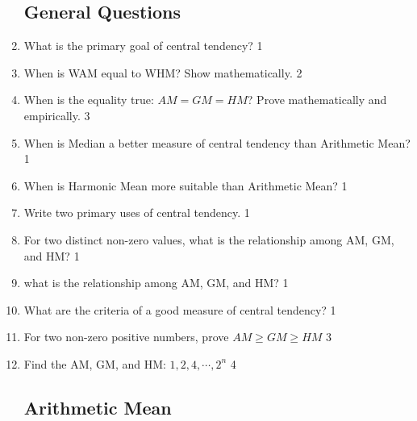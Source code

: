 \documentclass[a4paper,oneside]{book}
\begin{document}
\begin{enumerate}

\subsection{General Questions}

    \item What is the primary goal of central tendency? \hfill 1
    \item When is WAM equal to WHM? Show mathematically. \hfill 2
    \item When is the equality true: $AM=GM=HM$? Prove mathematically and empirically.  \hfill 3
    \item When is Median a better measure of central tendency than Arithmetic Mean?  \hfill 1
    \item When is Harmonic Mean more suitable than Arithmetic Mean?  \hfill 1
    \item Write two primary uses of central tendency. \hfill 1
    \item For two distinct non-zero values, what is the relationship among AM, GM, and HM? \hfill 1
    \item what is the relationship among AM, GM, and HM? \hfill 1
    \item What are the criteria of a good measure of central tendency? \hfill 1
    \item For two non-zero positive numbers, prove $AM \ge GM \ge HM$ \hfill 3
    \item Find the AM, GM, and HM: $1,2,4,\cdots, 2^n$ \hfill 4

    
\subsection{Arithmetic Mean}


\end{enumerate}
\end{document}
